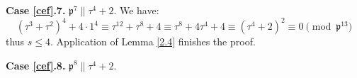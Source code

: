 \documentclass[12pt]{article}
\theoremstyle{remark}
\begin{document}














\textbf{Case \ref{cef}.7.} $\mathfrak{p}^7 \parallel \tau^4+2$. We have:
\[ (\tau^3+\tau^2)^4+4\cdot1^4 \equiv \tau^{12}+\tau^8+4 \equiv \tau^8+4\tau^4+4 \equiv (\tau^4+2)^2 \equiv 0 \pmod{\mathfrak{p}^{13}}\]
thus $s \leq 4$. Application of Lemma \ref{2.4} finishes the proof.

\textbf{Case \ref{cef}.8.} $\mathfrak{p}^8 \parallel \tau^4+2$. 
\end{document}
